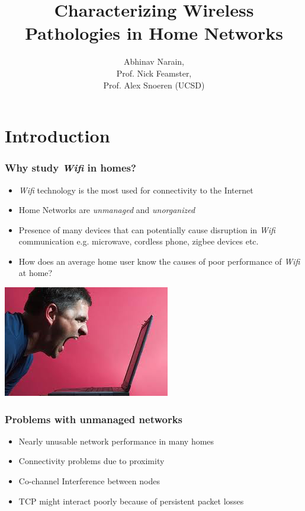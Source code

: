 \documentclass{beamer}
\title[] {Characterizing Wireless Pathologies in Home Networks}
\author[] 
{Abhinav Narain, \\
Prof. Nick Feamster,\\
Prof. Alex Snoeren (UCSD)}
\institute[PhD Qualifier Presentation]
{College of Computing\\
School of Computer Science\\
 Georgia Institute of Technology}
\begin{document}
{
\begin{frame}
  \titlepage 
\end{frame}
}

\section{Introduction}
\begin{frame}
  \frametitle{Why study \textit{Wifi} in homes?}
  \begin{itemize} 
  \item \textit{Wifi} technology is the most used for connectivity to the Internet
  \item Home Networks are \textit{unmanaged} and \textit{unorganized}
  \item Presence of many devices that can potentially cause disruption
    in \textit{Wifi} communication e.g. microwave, cordless phone, zigbee
    devices etc.
  \item How does an average home user know the causes of poor
    performance of \textit{Wifi} at home?
  \end{itemize}
   \begin{overlayarea}{\textwidth}{.4\textheight}
     \centering
     \includegraphics[width=.4\textwidth]{./images/wireless_frust.png}
   \end{overlayarea}
\end{frame}

\begin{frame}
  \frametitle{Problems with unmanaged networks} 
    \begin{itemize}
      \item Nearly unusable network performance in many homes
      \item Connectivity problems due to proximity
      \item Co-channel Interference between nodes
      \item TCP might interact poorly because of persistent packet losses
    \end{itemize}
\end{frame}
\end{document}

